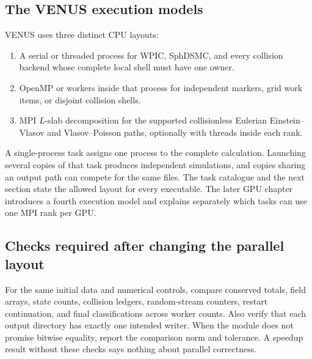 \subsection{The VENUS execution models}

VENUS uses three distinct CPU layouts:

\begin{enumerate}
\item A serial or threaded process for WPIC, SphDSMC, and every collision
      backend whose complete local shell must have one owner.
\item OpenMP or  workers inside that process for independent
      markers, grid work items, or disjoint collision shells.
\item MPI \(L\)-slab decomposition for the supported collisionless Eulerian
      Einstein--Vlasov and Vlasov--Poisson paths, optionally with threads
      inside each rank.
\end{enumerate}

A single-process task assigns one process to the complete calculation.
Launching several copies of that task produces independent simulations, and
copies sharing an output path can compete for the same files.  The task catalogue and the next
section state the allowed layout for every executable.  The later GPU chapter
introduces a fourth execution model and explains separately which tasks can
use one MPI rank per GPU.

\subsection{Checks required after changing the parallel layout}

For the same initial data and numerical controls, compare conserved totals,
field arrays, state counts, collision ledgers, random-stream counters, restart
continuation, and final classifications across worker counts.  Also verify
that each output directory has exactly one intended writer.  When the module
does not promise bitwise equality, report the comparison norm and tolerance.
A speedup result without these checks says nothing about parallel correctness.

